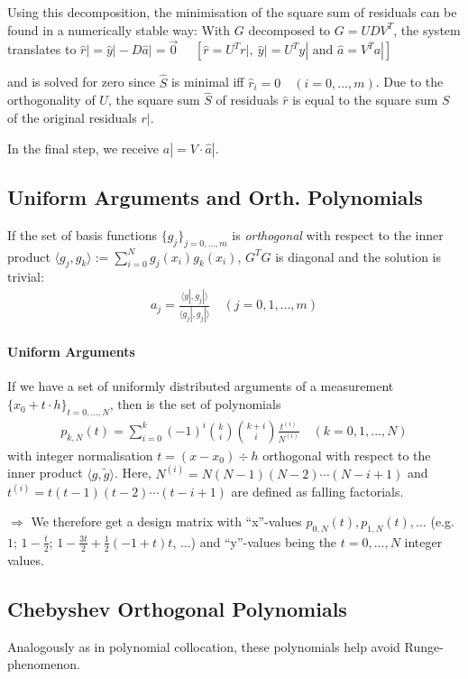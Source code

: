 Using this decomposition, the minimisation of the square sum of residuals can be found in a numerically stable way:
With $G$ decomposed to $G=UDV^T$, the system translates to
\colorbox{shadecolor}{
    $\hat{r}| = \hat{y}| - D\hat{a}| = \vec{0}\quad$
        {\color{darkgray} $\left[\hat{r} = U^Tr|,\ \hat{y}| = U^Ty|\text{ and }\hat{a} = V^Ta|\right]$}
}

and is solved for zero since $\hat{S}$ is minimal iff $\hat{r}_i=0\quad(i=0,\ldots,m)$.
Due to the orthogonality of $U$, the square sum $\hat{S}$ of residuals $\hat{r}$ is equal to the square sum $S$ of the original
residuals $r|$.

In the final step, we receive $a| = V\cdot\hat{a}|$.

\subsection{Uniform Arguments and Orth. Polynomials}

If the set of basis functions $\{g_j\}_{j=0,\ldots,m}$ is \emph{orthogonal} with respect to the inner product
$\langle g_j,g_k\rangle := \sum_{i=0}^N g_j(x_i)g_k(x_i)$, $G^TG$ is diagonal and the solution is trivial:
\begin{align*}
    a_j=\frac{\langle y|, g_j|\rangle}{\langle g_j|, g_j|\rangle}\quad(j=0,1,\ldots,m)
\end{align*}

\paragraph{Uniform Arguments}
If we have a set of uniformly distributed arguments of a measurement $\{x_0 + t\cdot h\}_{t=0,\ldots,N}$,
then is the set of polynomials
\begin{align*}
    p_{k,N}(t)
    = \sum_{i=0}^{k}(-1)^{i}{\binom{k}{i}}{\binom{k+i}{i}}{\frac{t^{(i)}}{N^{(i)}}}\quad(k=0,1,...,N)
\end{align*}
with integer normalisation $t = (x-x_0)\div h$ orthogonal with respect to the inner product $\langle g,\tilde{g}\rangle$.
Here, $N^{(i)} = N(N-1)(N-2)\cdots(N-i+1)$ and $t^{(i)} = t(t-1)(t-2)\cdots(t-i+1)$ are defined as falling factorials.

$\Rightarrow$ We therefore get a design matrix with ``x''-values $p_{0,N}(t), p_{1,N}(t),\ldots$
(e.g. $1$; $1-\frac{t}{2}$; $1-\frac{3t}{2}+\frac{1}{2}(-1+t)t$, ...) and ``y''-values being the $t=0,\ldots,N$ integer values.

\subsection{Chebyshev Orthogonal Polynomials}
Analogously as in polynomial collocation, these polynomials help avoid Runge-phenomenon.

